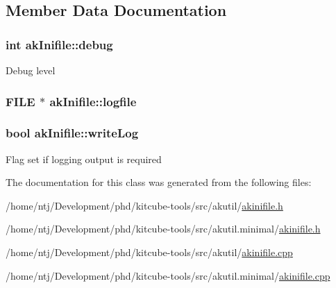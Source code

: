 \subsection{Member Data Documentation}
\hypertarget{classakInifile_a0b8a73d04d2b7a677bd61af9d87faec3}{
\subsubsection[{debug}]{\setlength{\rightskip}{0pt plus 5cm}int ak\-Inifile\-::debug\hspace{0.3cm}{\ttfamily [private]}}}\label{classakInifile_a0b8a73d04d2b7a677bd61af9d87faec3}
Debug level \hypertarget{classakInifile_a9c55ea25efdedced0815835562454354}{
\subsubsection[{logfile}]{\setlength{\rightskip}{0pt plus 5cm}F\-I\-L\-E $\ast$ ak\-Inifile\-::logfile\hspace{0.3cm}{\ttfamily [private]}}}\label{classakInifile_a9c55ea25efdedced0815835562454354}
\hypertarget{classakInifile_aa1cb47c582ed7c93aae1a9ecfff6b0c2}{
\subsubsection[{write\-Log}]{\setlength{\rightskip}{0pt plus 5cm}bool ak\-Inifile\-::write\-Log\hspace{0.3cm}{\ttfamily [private]}}}\label{classakInifile_aa1cb47c582ed7c93aae1a9ecfff6b0c2}
Flag set if logging output is required 

The documentation for this class was generated from the following files\-:\begin{DoxyCompactItemize}
\item 
/home/ntj/\-Development/phd/kitcube-\/tools/src/akutil/\hyperlink{akinifile_8h}{akinifile.\-h}\item 
/home/ntj/\-Development/phd/kitcube-\/tools/src/akutil.\-minimal/\hyperlink{minimal_2akinifile_8h}{akinifile.\-h}\item 
/home/ntj/\-Development/phd/kitcube-\/tools/src/akutil/\hyperlink{akinifile_8cpp}{akinifile.\-cpp}\item 
/home/ntj/\-Development/phd/kitcube-\/tools/src/akutil.\-minimal/\hyperlink{minimal_2akinifile_8cpp}{akinifile.\-cpp}\end{DoxyCompactItemize}
